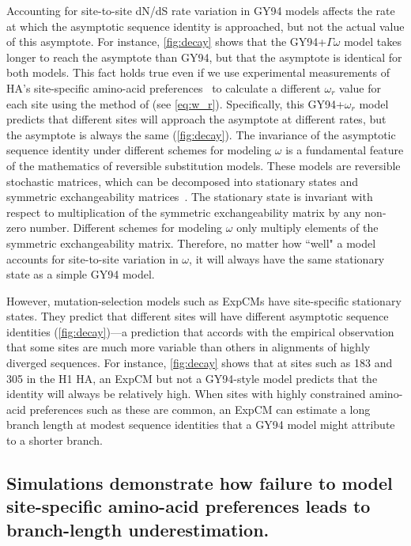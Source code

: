 \documentclass[11pt]{article}
\begin{document}
Accounting for site-to-site dN/dS rate variation in GY94 models affects the rate at which the asymptotic sequence identity is approached, but not the actual value of this asymptote.
For instance, \ref{fig:decay} shows that the GY94+$\Gamma\omega$ model takes longer to reach the asymptote than GY94, but that the asymptote is identical for both models. 
This fact holds true even if we use experimental measurements of HA's site-specific amino-acid preferences~\citep{doud2016accurate} to calculate a different $\omega_r$ value for each site using the method of \citet{spielman2015relationship} (see \ref{eq:w_r}).
Specifically, this GY94+$\omega_r$ model predicts that different sites will approach the asymptote at different rates, but the asymptote is always the same (\ref{fig:decay}).
The invariance of the asymptotic sequence identity under different schemes for modeling $\omega$ is a fundamental feature of the mathematics of reversible substitution models.
These models are reversible stochastic matrices, which can be decomposed into stationary states and symmetric exchangeability matrices~\citep{nielsen2006statistical}.
The stationary state is invariant with respect to multiplication of the symmetric exchangeability matrix by any non-zero number.
Different schemes for modeling $\omega$ only multiply elements of the symmetric exchangeability matrix.
Therefore, no matter how ``well" a model accounts for site-to-site variation in $\omega$, it will always have the same stationary state as a simple GY94 model. 

However, mutation-selection models such as ExpCMs have site-specific stationary states.
They predict that different sites will have different asymptotic sequence identities (\ref{fig:decay})---a prediction that accords with the empirical observation that some sites are much more variable than others in alignments of highly diverged sequences.
For instance, \ref{fig:decay} shows that at sites such as 183 and 305 in the H1 HA, an ExpCM but not a GY94-style model predicts that the identity will always be relatively high. 
When sites with highly constrained amino-acid preferences such as these are common, an ExpCM can estimate a long branch length at modest sequence identities that a GY94 model might attribute to a shorter branch.


\subsection*{Simulations demonstrate how failure to model site-specific amino-acid preferences leads to branch-length underestimation.}
\end{document}
